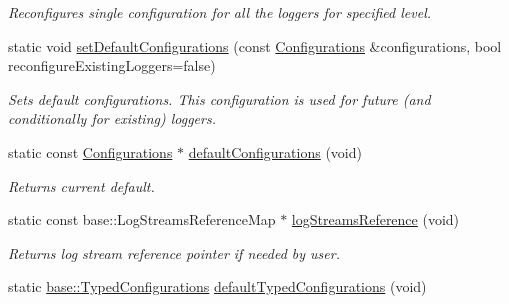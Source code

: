 \begin{DoxyCompactItemize}
\begin{DoxyCompactList}\small\item\em Reconfigures single configuration for all the loggers for specified level. \end{DoxyCompactList}\item 
\hypertarget{a00049_ab9fb62a8ff904ff887fefde3282f46a4}{}static void \hyperlink{a00049_ab9fb62a8ff904ff887fefde3282f46a4}{set\+Default\+Configurations} (const \hyperlink{a00014}{Configurations} \&configurations, bool reconfigure\+Existing\+Loggers=false)\label{a00049_ab9fb62a8ff904ff887fefde3282f46a4}

\begin{DoxyCompactList}\small\item\em Sets default configurations. This configuration is used for future (and conditionally for existing) loggers. \end{DoxyCompactList}\item 
\hypertarget{a00049_a96f2336fafdc3ef2c4df01a73ae5ffb7}{}static const \hyperlink{a00014}{Configurations} $\ast$ \hyperlink{a00049_a96f2336fafdc3ef2c4df01a73ae5ffb7}{default\+Configurations} (void)\label{a00049_a96f2336fafdc3ef2c4df01a73ae5ffb7}

\begin{DoxyCompactList}\small\item\em Returns current default. \end{DoxyCompactList}\item 
\hypertarget{a00049_ad17312c9474d94bc98efcaf08ca279a4}{}static const base\+::\+Log\+Streams\+Reference\+Map $\ast$ \hyperlink{a00049_ad17312c9474d94bc98efcaf08ca279a4}{log\+Streams\+Reference} (void)\label{a00049_ad17312c9474d94bc98efcaf08ca279a4}

\begin{DoxyCompactList}\small\item\em Returns log stream reference pointer if needed by user. \end{DoxyCompactList}\item 
\hypertarget{a00049_af296007c3eb3b71602ec80ff59875b46}{}static \hyperlink{a00092}{base\+::\+Typed\+Configurations} \hyperlink{a00049_af296007c3eb3b71602ec80ff59875b46}{default\+Typed\+Configurations} (void)\label{a00049_af296007c3eb3b71602ec80ff59875b46}


\end{DoxyCompactItemize}
